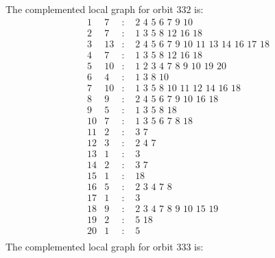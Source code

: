 \documentclass[12pt]{article}
\begin{document}
The complemented local graph for orbit $332$ is:
\begin{equation*}
\begin{array}{rrcl}
1&7&:&\,\,2\,\,4\,\,5\,\,6\,\,7\,\,9\,\,10\\
2&7&:&\,\,1\,\,3\,\,5\,\,8\,\,12\,\,16\,\,18\\
3&13&:&\,\,2\,\,4\,\,5\,\,6\,\,7\,\,9\,\,10\,\,11\,\,13\,\,14\,\,16\,\,17\,\,18\\
4&7&:&\,\,1\,\,3\,\,5\,\,8\,\,12\,\,16\,\,18\\
5&10&:&\,\,1\,\,2\,\,3\,\,4\,\,7\,\,8\,\,9\,\,10\,\,19\,\,20\\
6&4&:&\,\,1\,\,3\,\,8\,\,10\\
7&10&:&\,\,1\,\,3\,\,5\,\,8\,\,10\,\,11\,\,12\,\,14\,\,16\,\,18\\
8&9&:&\,\,2\,\,4\,\,5\,\,6\,\,7\,\,9\,\,10\,\,16\,\,18\\
9&5&:&\,\,1\,\,3\,\,5\,\,8\,\,18\\
10&7&:&\,\,1\,\,3\,\,5\,\,6\,\,7\,\,8\,\,18\\
11&2&:&\,\,3\,\,7\\
12&3&:&\,\,2\,\,4\,\,7\\
13&1&:&\,\,3\\
14&2&:&\,\,3\,\,7\\
15&1&:&\,\,18\\
16&5&:&\,\,2\,\,3\,\,4\,\,7\,\,8\\
17&1&:&\,\,3\\
18&9&:&\,\,2\,\,3\,\,4\,\,7\,\,8\,\,9\,\,10\,\,15\,\,19\\
19&2&:&\,\,5\,\,18\\
20&1&:&\,\,5\\
\end{array}
\end{equation*}
The complemented local graph for orbit $333$ is:
\end{document}
